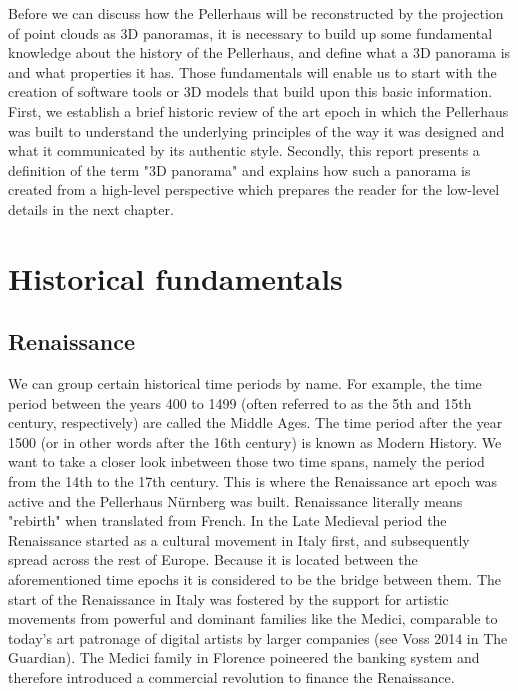 Before we can discuss how the Pellerhaus will be reconstructed by the projection of point clouds as 3D panoramas, it is necessary to build up some fundamental knowledge about the history of the Pellerhaus, and define what a 3D panorama is and what properties it has. Those fundamentals will enable us to start with the creation of software tools or 3D models that build upon this basic information. First, we establish a brief historic review of the art epoch in which the Pellerhaus was built to understand the underlying principles of the way it was designed and what it communicated by its authentic style. Secondly, this report presents a definition of the term "3D panorama" and explains how such a panorama is created from a high-level perspective which prepares the reader for the low-level details in the next chapter.

\section{Historical fundamentals}

\subsection{Renaissance}

We can group certain historical time periods by name. For example, the time period between the years 400 to 1499 (often referred to as the 5th and 15th century, respectively) are called the Middle Ages. The time period after the year 1500 (or in other words after the 16th century) is known as Modern History. We want to take a closer look inbetween those two time spans, namely the period from the 14th to the 17th century. This is where the Renaissance art epoch was active and the Pellerhaus Nürnberg was built. Renaissance literally means "rebirth" when translated from French. In the Late Medieval period the Renaissance started as a cultural movement in Italy first, and subsequently spread across the rest of Europe. Because it is located between the aforementioned time epochs it is considered to be the bridge between them. The start of the Renaissance in Italy was fostered by the support for artistic movements from powerful and dominant families like the Medici, comparable to today's art patronage of digital artists by larger companies (see Voss 2014 \parencite{art_patronage_google} in The Guardian). The Medici family in Florence poineered the banking system and therefore introduced a commercial revolution to finance the Renaissance.

